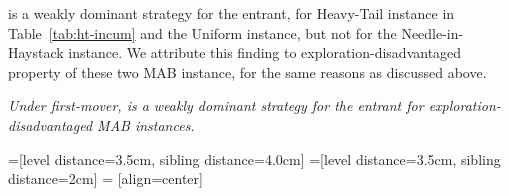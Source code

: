 \documentclass[../competing_bandits_with_appendix.tex]{subfiles}
\begin{document}


\DG is a weakly dominant strategy for the entrant, for Heavy-Tail instance in Table~\ref{tab:ht-incum} and the Uniform instance, but not for the Needle-in-Haystack instance. We attribute this finding to exploration-disadvantaged property of these two MAB instance, for the same reasons as discussed above.

\begin{finding}\label{find:temp-monopoly-entrant}
\textit{Under first-mover, \DG is a weakly dominant strategy for the entrant for exploration-disadvantaged MAB instances.
}
\end{finding}


=[level distance=3.5cm, sibling distance=4.0cm]
=[level distance=3.5cm, sibling distance=2cm]
 = [align=center]
\end{document}
